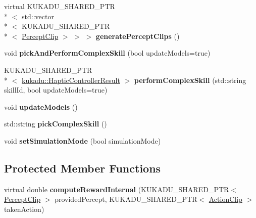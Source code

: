 \begin{DoxyCompactItemize}
\item 
\hypertarget{classkukadu_1_1HapticPlanner_a9748d448f421504336013c4aa98e243d}{virtual K\-U\-K\-A\-D\-U\-\_\-\-S\-H\-A\-R\-E\-D\-\_\-\-P\-T\-R\\*
$<$ std\-::vector\\*
$<$ K\-U\-K\-A\-D\-U\-\_\-\-S\-H\-A\-R\-E\-D\-\_\-\-P\-T\-R\\*
$<$ \hyperlink{classkukadu_1_1PerceptClip}{Percept\-Clip} $>$ $>$ $>$ {\bfseries generate\-Percept\-Clips} ()}\label{classkukadu_1_1HapticPlanner_a9748d448f421504336013c4aa98e243d}

\item 
\hypertarget{classkukadu_1_1HapticPlanner_a267e6afa41919c58b1a37bd0e460dfb9}{void {\bfseries pick\-And\-Perform\-Complex\-Skill} (bool update\-Models=true)}\label{classkukadu_1_1HapticPlanner_a267e6afa41919c58b1a37bd0e460dfb9}

\item 
\hypertarget{classkukadu_1_1HapticPlanner_ac8eb5e6c2b41dc7766c1503b50541302}{K\-U\-K\-A\-D\-U\-\_\-\-S\-H\-A\-R\-E\-D\-\_\-\-P\-T\-R\\*
$<$ \hyperlink{classkukadu_1_1HapticControllerResult}{kukadu\-::\-Haptic\-Controller\-Result} $>$ {\bfseries perform\-Complex\-Skill} (std\-::string skill\-Id, bool update\-Models=true)}\label{classkukadu_1_1HapticPlanner_ac8eb5e6c2b41dc7766c1503b50541302}

\item 
\hypertarget{classkukadu_1_1HapticPlanner_a2ed1772fee9f9b2dc4930b66896cb5ff}{void {\bfseries update\-Models} ()}\label{classkukadu_1_1HapticPlanner_a2ed1772fee9f9b2dc4930b66896cb5ff}

\item 
\hypertarget{classkukadu_1_1HapticPlanner_a87764109bd04a93c93f91a37de9dd214}{std\-::string {\bfseries pick\-Complex\-Skill} ()}\label{classkukadu_1_1HapticPlanner_a87764109bd04a93c93f91a37de9dd214}

\item 
\hypertarget{classkukadu_1_1HapticPlanner_afc97d78845cd9675993f352845c5c02e}{void {\bfseries set\-Simulation\-Mode} (bool simulation\-Mode)}\label{classkukadu_1_1HapticPlanner_afc97d78845cd9675993f352845c5c02e}

\end{DoxyCompactItemize}
\subsection*{Protected Member Functions}
\begin{DoxyCompactItemize}
\item 
\hypertarget{classkukadu_1_1HapticPlanner_a8d73a2aa0ca782970a1885a7b8970e5f}{virtual double {\bfseries compute\-Reward\-Internal} (K\-U\-K\-A\-D\-U\-\_\-\-S\-H\-A\-R\-E\-D\-\_\-\-P\-T\-R$<$ \hyperlink{classkukadu_1_1PerceptClip}{Percept\-Clip} $>$ provided\-Percept, K\-U\-K\-A\-D\-U\-\_\-\-S\-H\-A\-R\-E\-D\-\_\-\-P\-T\-R$<$ \hyperlink{classkukadu_1_1ActionClip}{Action\-Clip} $>$ taken\-Action)}\label{classkukadu_1_1HapticPlanner_a8d73a2aa0ca782970a1885a7b8970e5f}

\end{DoxyCompactItemize}
